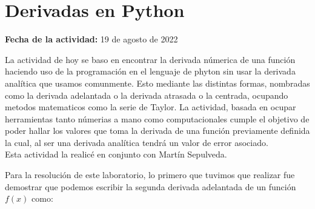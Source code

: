 \documentclass[../portafolio.tex]{subfiles}
\begin{document}


\section{Derivadas en Python}   %

\hfill \textbf{Fecha de la actividad:} 19 de agosto de 2022

\medskip

La actividad de hoy se baso en encontrar la derivada n\'umerica de una funci\'on haciendo uso de la programaci\'on en el lenguaje de phyton sin usar la derivada anal\'itica que usamos comunmente.
Esto mediante las distintas formas, nombradas como la derivada adelantada o la derivada atrasada o la centrada, ocupando metodos matematicos como la serie de Taylor. La actividad, basada en ocupar herramientas tanto n\'umerias a mano como computacionales cumple el objetivo de poder hallar los valores que toma la derivada de una funci\'on previamente definida la cual, al ser una derivada anal\'itica tendr\'a un valor de error asociado.
\\
Esta actividad la realic\'e en conjunto con Mart\'in Sepulveda.


Para la resoluci\'on de este laboratorio, lo primero que tuvimos que realizar fue demostrar que podemos escribir la segunda derivada adelantada de un funci\'on $f(x)$ como:
\end{document}
